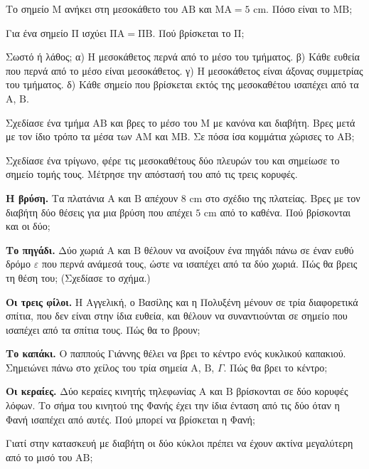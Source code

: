 \ex Το σημείο $\mathrm{Μ}$ ανήκει στη μεσοκάθετο του $\mathrm{ΑΒ}$ και $\mathrm{ΜΑ}=5$ cm. Πόσο είναι το $\mathrm{ΜΒ}$;

\ex Για ένα σημείο $\mathrm{Π}$ ισχύει $\mathrm{ΠΑ}=\mathrm{ΠΒ}$. Πού βρίσκεται το $\mathrm{Π}$;

\ex Σωστό ή λάθος; α) Η μεσοκάθετος περνά από το μέσο του τμήματος. \quad β) Κάθε ευθεία που περνά από το μέσο είναι μεσοκάθετος. \quad γ) Η μεσοκάθετος είναι άξονας συμμετρίας του τμήματος. \quad δ) Κάθε σημείο που βρίσκεται εκτός της μεσοκαθέτου ισαπέχει από τα $\mathrm{Α}$, $\mathrm{Β}$.

\ex Σχεδίασε ένα τμήμα $\mathrm{ΑΒ}$ και βρες το μέσο του $\mathrm{Μ}$ με κανόνα και διαβήτη. Βρες μετά με τον ίδιο τρόπο τα μέσα των $\mathrm{ΑΜ}$ και $\mathrm{ΜΒ}$. Σε πόσα ίσα κομμάτια χώρισες το $\mathrm{ΑΒ}$;

\ex Σχεδίασε ένα τρίγωνο, φέρε τις μεσοκαθέτους δύο πλευρών του και σημείωσε το σημείο τομής τους. Μέτρησε την απόστασή του από τις τρεις κορυφές.


\ex \textbf{Η βρύση.} Τα πλατάνια $\mathrm{Α}$ και $\mathrm{Β}$ απέχουν $8$ cm στο σχέδιο της πλατείας. Βρες με τον διαβήτη δύο θέσεις για μια βρύση που απέχει $5$ cm από το καθένα. Πού βρίσκονται και οι δύο;

\ex \textbf{Το πηγάδι.} Δύο χωριά $\mathrm{Α}$ και $\mathrm{Β}$ θέλουν να ανοίξουν ένα πηγάδι πάνω σε έναν ευθύ δρόμο $\varepsilon$ που περνά ανάμεσά τους, ώστε να ισαπέχει από τα δύο χωριά. Πώς θα βρεις τη θέση του; (Σχεδίασε το σχήμα.)

\ex \textbf{Οι τρεις φίλοι.} Η Αγγελική, ο Βασίλης και η Πολυξένη μένουν σε τρία διαφορετικά σπίτια, που δεν είναι στην ίδια ευθεία, και θέλουν να συναντιούνται σε σημείο που ισαπέχει από τα σπίτια τους. Πώς θα το βρουν;

\ex \textbf{Το καπάκι.} Ο παππούς Γιάννης θέλει να βρει το κέντρο ενός κυκλικού καπακιού. Σημειώνει πάνω στο χείλος του τρία σημεία $\mathrm{Α}$, $\mathrm{Β}$, $\Gamma$. Πώς θα βρει το κέντρο;

\ex \textbf{Οι κεραίες.} Δύο κεραίες κινητής τηλεφωνίας $\mathrm{Α}$ και $\mathrm{Β}$ βρίσκονται σε δύο κορυφές λόφων. Το σήμα του κινητού της Φανής έχει την ίδια ένταση από τις δύο όταν η Φανή ισαπέχει από αυτές. Πού μπορεί να βρίσκεται η Φανή;


\ex Γιατί στην κατασκευή με διαβήτη οι δύο κύκλοι πρέπει να έχουν ακτίνα μεγαλύτερη από το μισό του $\mathrm{ΑΒ}$;

